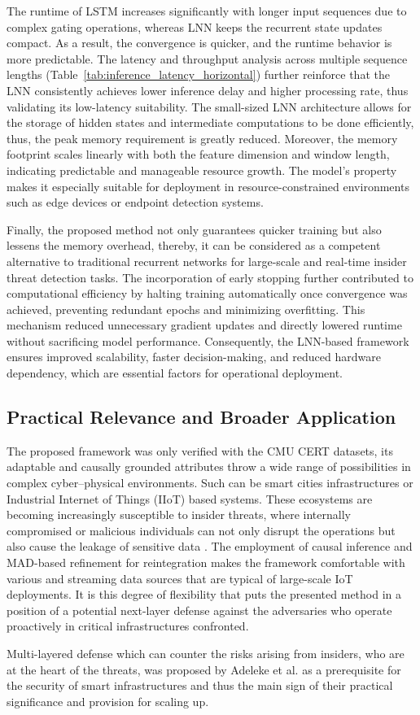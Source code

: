 The runtime of LSTM increases significantly with longer input sequences due to complex gating operations, whereas LNN keeps the recurrent state updates compact. As a result, the convergence is quicker, and the runtime behavior is more predictable. The latency and throughput analysis across multiple sequence lengths (Table~\ref{tab:inference_latency_horizontal}) further reinforce that the LNN consistently achieves lower inference delay and higher processing rate, thus validating its low-latency suitability. 
The small-sized LNN architecture allows for the storage of hidden states and intermediate computations to be done efficiently, thus, the peak memory requirement is greatly reduced. Moreover, the memory footprint scales linearly with both the feature dimension and window length, indicating predictable and manageable resource growth. The model's property makes it especially suitable for deployment in resource-constrained environments such as edge devices or endpoint detection systems. 

Finally, the proposed method not only guarantees quicker training but also lessens the memory overhead, thereby, it can be considered as a competent alternative to traditional recurrent networks for large-scale and real-time insider threat detection tasks. The incorporation of early stopping further contributed to computational efficiency by halting training automatically once convergence was achieved, preventing redundant epochs and minimizing overfitting. This mechanism reduced unnecessary gradient updates and directly lowered runtime without sacrificing model performance. Consequently, the LNN-based framework ensures improved scalability, faster decision-making, and reduced hardware dependency, which are essential factors for operational deployment.


\subsection{Practical Relevance and Broader Application}
The proposed framework was only verified with the CMU CERT datasets, its adaptable and causally grounded attributes throw a wide range of possibilities in complex cyber–physical environments. Such can be smart cities  infrastructures or Industrial Internet of Things (IIoT) based systems. These ecosystems are becoming increasingly susceptible to insider threats, where internally compromised or malicious individuals can not only disrupt the operations but also cause the leakage of sensitive data \cite{amiri2023federated, 11082266}. The employment of causal inference and MAD-based refinement for reintegration makes the framework comfortable with various and streaming data sources that are typical of large-scale IoT deployments. It is this degree of flexibility that puts the presented method in a position of a potential next-layer defense against the adversaries who operate proactively in critical infrastructures confronted.

Multi-layered defense which can counter the risks arising from insiders, who are at the heart of the threats, was proposed by Adeleke et al.\cite{Adeleke2025} as a prerequisite for the security of smart infrastructures and thus the main sign of their practical significance and provision for scaling‌ up.
